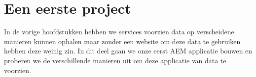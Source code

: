 \documentclass{article}
\begin{document}
	\section{Een eerste project}
	In de vorige hoofdstukken hebben we services voorzien data op verscheidene manieren kunnen ophalen maar zonder een website om deze data te gebruiken hebben deze weinig zin. In dit deel gaan we onze eerst AEM applicatie bouwen en proberen we de verschillende manieren uit om deze applicatie van data te voorzien.
\end{document}
